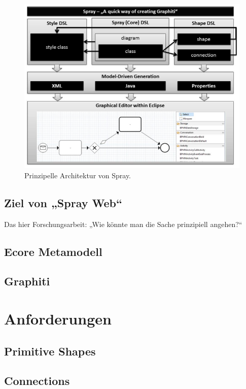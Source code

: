 \begin{figure}[h!]
  \centering
  \includegraphics[width=1.0\textwidth]{Figures/SprayArchitektur.png}
  \caption{Prinzipelle Architektur von Spray. \citep[aus][S.~3]{sprayPaper}}\label{fig.sprayArchi}
\end{figure}

\subsection{Ziel von „Spray Web“}

Das hier Forschungsarbeit: „Wie könnte man die Sache prinzipiell angehen?“

\subsection{Ecore Metamodell}

\subsection{Graphiti}


\section{Anforderungen}

\subsection{Primitive Shapes}

\subsection{Connections}


